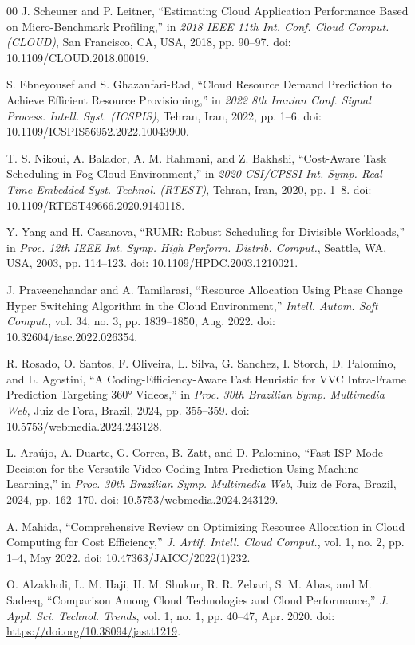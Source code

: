 \documentclass[conference]{IEEEtran}
\begin{document}
\begin{thebibliography}{00}
		 J. Scheuner and P. Leitner, ``Estimating Cloud Application Performance Based on Micro-Benchmark Profiling,'' in \emph{2018 IEEE 11th Int. Conf. Cloud Comput. (CLOUD)}, San Francisco, CA, USA, 2018, pp. 90--97. doi: 10.1109/CLOUD.2018.00019.
		
		 S. Ebneyousef and S. Ghazanfari-Rad, ``Cloud Resource Demand Prediction to Achieve Efficient Resource Provisioning,'' in \emph{2022 8th Iranian Conf. Signal Process. Intell. Syst. (ICSPIS)}, Tehran, Iran, 2022, pp. 1--6. doi: 10.1109/ICSPIS56952.2022.10043900.
		
		 T. S. Nikoui, A. Balador, A. M. Rahmani, and Z. Bakhshi, ``Cost-Aware Task Scheduling in Fog-Cloud Environment,'' in \emph{2020 CSI/CPSSI Int. Symp. Real-Time Embedded Syst. Technol. (RTEST)}, Tehran, Iran, 2020, pp. 1--8. doi: 10.1109/RTEST49666.2020.9140118.
		
		 Y. Yang and H. Casanova, ``RUMR: Robust Scheduling for Divisible Workloads,'' in \emph{Proc. 12th IEEE Int. Symp. High Perform. Distrib. Comput.}, Seattle, WA, USA, 2003, pp. 114--123. doi: 10.1109/HPDC.2003.1210021.
		
		 J. Praveenchandar and A. Tamilarasi, ``Resource Allocation Using Phase Change Hyper Switching Algorithm in the Cloud Environment,'' \emph{Intell. Autom. Soft Comput.}, vol. 34, no. 3, pp. 1839--1850, Aug. 2022. doi: 10.32604/iasc.2022.026354.
		
		 R. Rosado, O. Santos, F. Oliveira, L. Silva, G. Sanchez, I. Storch, D. Palomino, and L. Agostini, ``A Coding-Efficiency-Aware Fast Heuristic for VVC Intra-Frame Prediction Targeting 360° Videos,'' in \emph{Proc. 30th Brazilian Symp. Multimedia Web}, Juiz de Fora, Brazil, 2024, pp. 355--359. doi: 10.5753/webmedia.2024.243128.
		
		 L. Araújo, A. Duarte, G. Correa, B. Zatt, and D. Palomino, ``Fast ISP Mode Decision for the Versatile Video Coding Intra Prediction Using Machine Learning,'' in \emph{Proc. 30th Brazilian Symp. Multimedia Web}, Juiz de Fora, Brazil, 2024, pp. 162--170. doi: 10.5753/webmedia.2024.243129.
		
		 A. Mahida, ``Comprehensive Review on Optimizing Resource Allocation in Cloud Computing for Cost Efficiency,'' \emph{J. Artif. Intell. Cloud Comput.}, vol. 1, no. 2, pp. 1--4, May 2022. doi: 10.47363/JAICC/2022(1)232.
		
		 O. Alzakholi, L. M. Haji, H. M. Shukur, R. R. Zebari, S. M. Abas, and M. Sadeeq, ``Comparison Among Cloud Technologies and Cloud Performance,'' \emph{J. Appl. Sci. Technol. Trends}, vol. 1, no. 1, pp. 40--47, Apr. 2020. doi: \url{https://doi.org/10.38094/jastt1219}.
		

\end{thebibliography}
\end{document}

